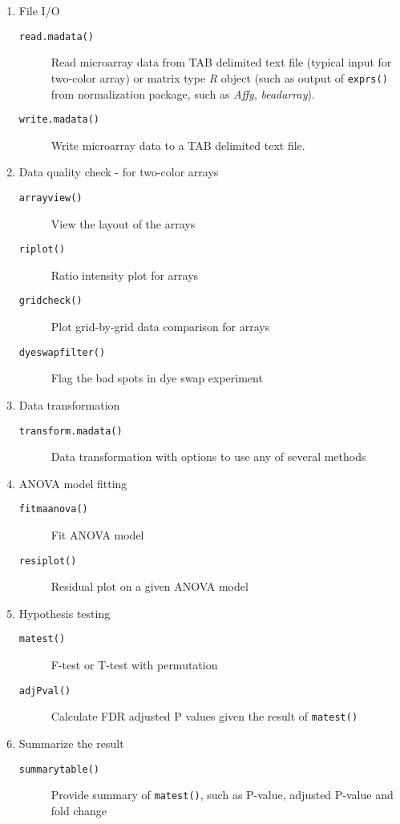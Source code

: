 \begin{enumerate}
\item File I/O
\begin{description}
\item[{\tt read.madata()}] Read microarray data from TAB delimited 
text file (typical input for two-color array) or matrix type {\em R} object
(such as output of {\tt exprs()} from normalization package, such as {\em Affy}, {\em beadarray}).
\item[{\tt write.madata()}] Write microarray data to a TAB delimited text file.
\end{description}
\item Data quality check - for two-color arrays
\begin{description}
\item[{\tt arrayview()}] View the layout of the arrays 
\item[{\tt riplot()}] Ratio intensity plot for arrays 
\item[{\tt gridcheck()}] Plot grid-by-grid data comparison for arrays
\item[{\tt dyeswapfilter()}] Flag the bad spots in dye swap experiment
\end{description}
\item Data transformation
\begin{description}
\item[{\tt transform.madata()}] Data transformation with options to use any of
several methods
\end{description}
\item ANOVA model fitting 
\begin{description}
\item[{\tt fitmaanova()}] Fit ANOVA model
\item[{\tt resiplot()}] Residual plot on a given ANOVA model
\end{description}
\item Hypothesis testing
\begin{description}
\item[{\tt matest()}] F-test or T-test with permutation
\item[{\tt adjPval()}] Calculate FDR adjusted P values given the result of {\tt matest()}
\end{description}
\item Summarize the result
\begin{description}
\item[{\tt summarytable()}] Provide summary of 
{\tt matest()}, such as P-value, adjusted P-value and fold change 

\end{description}
\end{enumerate}
